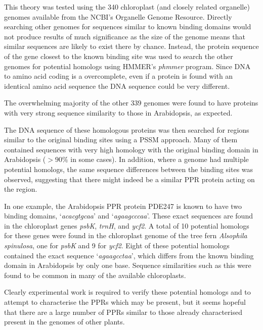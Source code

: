 This theory was tested using the 340 chloroplast (and closely related
organelle)
genomes available from the NCBI's Organelle Genome Resource.
Directly searching other genomes for sequences similar to known binding domains
would not produce results of much significance as the size of the genome means
that similar sequences are likely to exist there by chance.
Instead, the protein sequence of the gene closest to the known binding site was 
used to search the other genomes for potential homologs using HMMER's
\emph{phmmer} program.
Since DNA to amino acid coding is a overcomplete, even if a protein is found
with an identical amino acid sequence the DNA sequence could be very different.

The overwhelming majority of the other 339 genomes were found to have proteins 
with very strong sequence similarity to those in Arabidopsis, as expected. 

The DNA sequence of these homologous proteins was then searched for 
regions similar to the original binding sites using a PSSM approach.
Many of them contained sequences with very high homology
with the original binding domain in Arabidopsis ($>90\%$ in some cases).
In addition, where a genome had multiple potential homologs, the same sequence
differences between the binding sites was observed, suggesting that there might
indeed be a similar PPR protein acting on the region.

In one example, the Arabidopsis PPR protein PDE247 is known to have two 
binding domains, `\emph{acacgtgcaa}' and `\emph{agaagcccaa}'.
These exact sequences are found in the chloroplast genes \emph{psbK}, 
\emph{trnH}, and \emph{ycf2}.
A total of 10 potential homologs for these genes were found in the chloroplast
genome of the tree fern \emph{Alsophila spinulosa}, one for \emph{psbK} and 9
for \emph{ycf2}.
Eight of these potential homologs contained the exact sequence 
`\emph{agaagcctaa}', which differs from the known binding domain in Arabidopsis
by only one base.
Sequence similarities such as this were found to be common in many of the
available chloroplasts.

Clearly experimental work is required to verify these potential homologs and to
attempt to characterise the PPRs which may be present, but it seems hopeful
that there are a large number of PPRs similar to those already characterised
present in the genomes of other plants.

